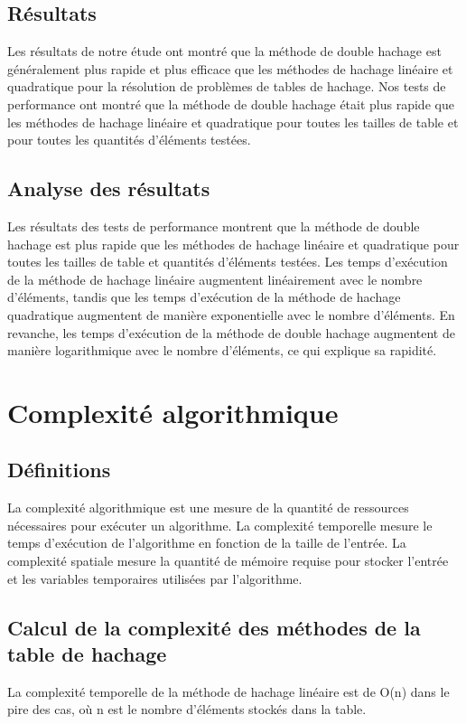 \documentclass[12pt]{article}
\begin{document}
    \subsection{Résultats}\label{subsec:resultats}
    Les résultats de notre étude ont montré que la méthode de double hachage est généralement plus rapide et plus efficace que les méthodes de hachage linéaire et quadratique pour la résolution de problèmes de tables de hachage.
    Nos tests de performance ont montré que la méthode de double hachage était plus rapide que les méthodes de hachage linéaire et quadratique pour toutes les tailles de table et pour toutes les quantités d'éléments testées.

    \subsection{Analyse des résultats}\label{subsec:analyse-des-resultats}
    Les résultats des tests de performance montrent que la méthode de double hachage est plus rapide que les méthodes de hachage linéaire et quadratique pour toutes les tailles de table et quantités d'éléments testées.
    Les temps d'exécution de la méthode de hachage linéaire augmentent linéairement avec le nombre d'éléments, tandis que les temps d'exécution de la méthode de hachage quadratique augmentent de manière exponentielle avec le nombre d'éléments.
    En revanche, les temps d'exécution de la méthode de double hachage augmentent de manière logarithmique avec le nombre d'éléments, ce qui explique sa rapidité.

    \section{Complexité algorithmique}\label{sec:Complexité algorithmique}
    \subsection{Définitions}\label{subsec:definitions}
    La complexité algorithmique est une mesure de la quantité de ressources nécessaires pour exécuter un algorithme.
    La complexité temporelle mesure le temps d'exécution de l'algorithme en fonction de la taille de l'entrée.
    La complexité spatiale mesure la quantité de mémoire requise pour stocker l'entrée et les variables temporaires utilisées par l'algorithme.

    \subsection{Calcul de la complexité des méthodes de la table de hachage}\label{subsec:calcul-de-la-complexite-des-methodes-de-la-table-de-hachage}
    La complexité temporelle de la méthode de hachage linéaire est de O(n) dans le pire des cas, où n est le nombre d'éléments stockés dans la table.
\end{document}
